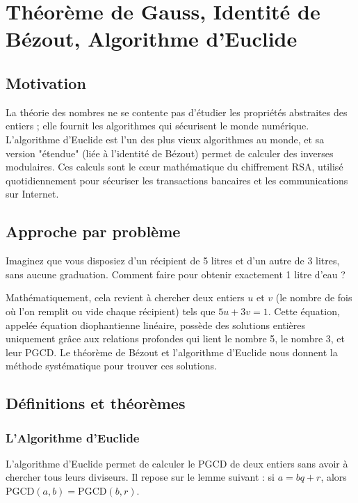 \section{Théorème de Gauss, Identité de Bézout, Algorithme d’Euclide}

\subsection{Motivation}
La théorie des nombres ne se contente pas d'étudier les propriétés abstraites des entiers ; elle fournit les algorithmes qui sécurisent le monde numérique. L'algorithme d'Euclide est l'un des plus vieux algorithmes au monde, et sa version "étendue" (liée à l'identité de Bézout) permet de calculer des inverses modulaires. Ces calculs sont le cœur mathématique du chiffrement RSA, utilisé quotidiennement pour sécuriser les transactions bancaires et les communications sur Internet.

\subsection{Approche par problème}
Imaginez que vous disposiez d'un récipient de 5 litres et d'un autre de 3 litres, sans aucune graduation. Comment faire pour obtenir exactement 1 litre d'eau ? 

Mathématiquement, cela revient à chercher deux entiers $u$ et $v$ (le nombre de fois où l'on remplit ou vide chaque récipient) tels que $5u + 3v = 1$. Cette équation, appelée équation diophantienne linéaire, possède des solutions entières uniquement grâce aux relations profondes qui lient le nombre 5, le nombre 3, et leur PGCD. Le théorème de Bézout et l'algorithme d'Euclide nous donnent la méthode systématique pour trouver ces solutions.

\subsection{Définitions et théorèmes}

\subsubsection{L'Algorithme d'Euclide}

L'algorithme d'Euclide permet de calculer le PGCD de deux entiers sans avoir à chercher tous leurs diviseurs. Il repose sur le lemme suivant : si $a = bq + r$, alors $\text{PGCD}(a, b) = \text{PGCD}(b, r)$.

